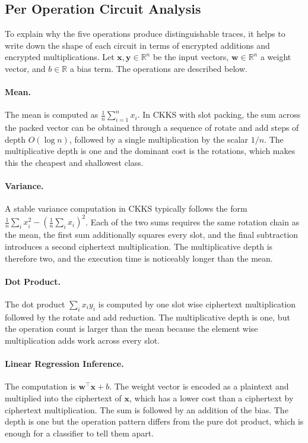 \documentclass[12pt,a4paper]{article}
\begin{document}
\subsection{Per Operation Circuit Analysis}
To explain why the five operations produce distinguishable traces, it helps to write down the shape of each circuit in terms of encrypted additions and encrypted multiplications. Let $\mathbf{x}, \mathbf{y} \in \mathbb{R}^n$ be the input vectors, $\mathbf{w} \in \mathbb{R}^n$ a weight vector, and $b \in \mathbb{R}$ a bias term. The operations are described below.

\paragraph{Mean.} The mean is computed as $\tfrac{1}{n}\sum_{i=1}^{n} x_i$. In CKKS with slot packing, the sum across the packed vector can be obtained through a sequence of rotate and add steps of depth $O(\log n)$, followed by a single multiplication by the scalar $1/n$. The multiplicative depth is one and the dominant cost is the rotations, which makes this the cheapest and shallowest class.

\paragraph{Variance.} A stable variance computation in CKKS typically follows the form $\tfrac{1}{n}\sum_i x_i^2 - \left(\tfrac{1}{n}\sum_i x_i\right)^2$. Each of the two sums requires the same rotation chain as the mean, the first sum additionally squares every slot, and the final subtraction introduces a second ciphertext multiplication. The multiplicative depth is therefore two, and the execution time is noticeably longer than the mean.

\paragraph{Dot Product.} The dot product $\sum_i x_i y_i$ is computed by one slot wise ciphertext multiplication followed by the rotate and add reduction. The multiplicative depth is one, but the operation count is larger than the mean because the element wise multiplication adds work across every slot.

\paragraph{Linear Regression Inference.} The computation is $\mathbf{w}^\top \mathbf{x} + b$. The weight vector is encoded as a plaintext and multiplied into the ciphertext of $\mathbf{x}$, which has a lower cost than a ciphertext by ciphertext multiplication. The sum is followed by an addition of the bias. The depth is one but the operation pattern differs from the pure dot product, which is enough for a classifier to tell them apart.
\end{document}
